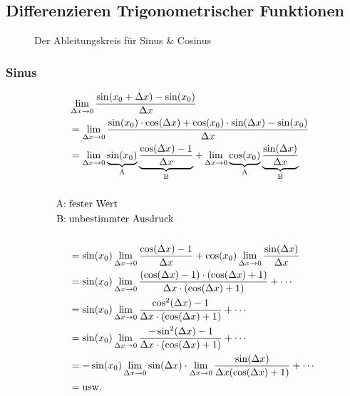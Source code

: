 \subsection{Differenzieren Trigonometrischer Funktionen}

\begin{figure}[H]
    \centering
    \caption{Der Ableitungskreis für Sinus \& Cosinus}
\end{figure}

\subsubsection{Sinus}

\begin{align*}
    & \lim_{\Delta x \rightarrow{} 0} \frac{\sin(x_0 + \Delta x) - \sin(x_0)}{\Delta x} \\
    &= \lim_{\Delta x \rightarrow{} 0} \frac{\sin(x_0) \cdot \cos(\Delta x) + \cos(x_0) \cdot \sin(\Delta x) - \sin(x_0)}{\Delta x} \\
    &= \lim_{\Delta x \rightarrow{} 0} \underbrace{\sin(x_0)}_{\text{A}} \underbrace{\frac{\cos(\Delta x) - 1}{\Delta x}}_{\text{B}} +
    \lim_{\Delta x \rightarrow{} 0} \underbrace{\cos(x_0)}_{\text{A}} \underbrace{\frac{\sin(\Delta x)}{\Delta x}}_{\text{B}} \\
    \\
    \text{A:\;} & \text{fester Wert} \\
    \text{B:\;} & \text{unbestimmter Ausdruck} \\
    \\
    &= \sin(x_0) \lim_{\Delta x \rightarrow{} 0} \frac{\cos(\Delta x) - 1}{\Delta x} + \cos(x_0) \lim_{\Delta x \rightarrow{} 0} \frac{\sin(\Delta x)}{\Delta x} \\
    &= \sin(x_0) \lim_{\Delta x \rightarrow{} 0} \frac{(\cos(\Delta x) - 1) \cdot (\cos(\Delta x) + 1)}{\Delta x \cdot (\cos(\Delta x) + 1)} + \cdots \\
    &= \sin(x_0) \lim_{\Delta x \rightarrow{} 0} \frac{\cos^2(\Delta x) - 1}{\Delta x \cdot (\cos(\Delta x) + 1)} + \cdots \\
    &= \sin(x_0) \lim_{\Delta x \rightarrow{} 0} \frac{- \sin^2(\Delta x) - 1}{\Delta x \cdot (\cos(\Delta x) + 1)} + \cdots \\
    &= -\sin(x_0) \lim_{\Delta x \rightarrow{} 0} \sin(\Delta x) \cdot \lim_{\Delta x \rightarrow{} 0} \frac{\sin(\Delta x)}{\Delta x (\cos(\Delta x) + 1)} + \cdots \\
    &= \text{usw.}
\end{align*}

